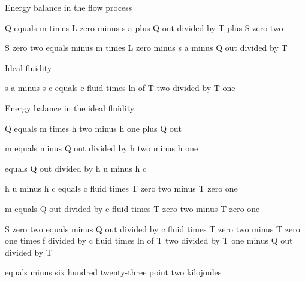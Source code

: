Energy balance in the flow process

Q equals m times L zero minus s a plus Q out divided by T plus S zero two

S zero two equals minus m times L zero minus s a minus Q out divided by T

Ideal fluidity

s a minus s c equals c fluid times ln of T two divided by T one

Energy balance in the ideal fluidity

Q equals m times h two minus h one plus Q out

m equals minus Q out divided by h two minus h one

equals Q out divided by h u minus h c

h u minus h c equals c fluid times T zero two minus T zero one

m equals Q out divided by c fluid times T zero two minus T zero one

S zero two equals minus Q out divided by c fluid times T zero two minus T zero one times f divided by c fluid times ln of T two divided by T one minus Q out divided by T

equals minus six hundred twenty-three point two kilojoules